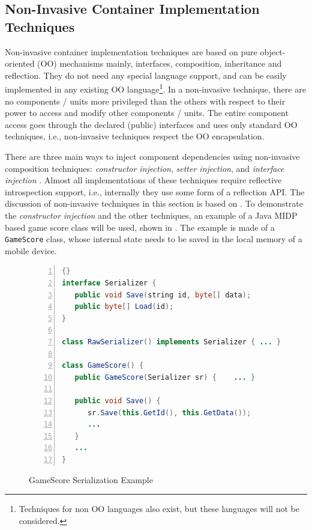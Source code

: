 \subsection{Non-Invasive Container Implementation Techniques}

Non-invasive container implementation techniques are based on pure object-oriented (OO) mechanisms mainly, interfaces, composition, inheritance and reflection. They do not need any special language support, and can be easily implemented in any existing OO language\footnote{Techniques for non OO languages also exist, but these languages will not be considered.}. In a non-invasive technique, there are no components / units more privileged than the others with respect to their power to access and modify other components / units. The entire component access goes through the declared (public) interfaces and uses only standard OO techniques, i.e., non-invasive techniques respect the OO encapsulation.

There are three main ways to inject component dependencies using non-invasive composition techniques: \textit{constructor injection}, \textit{setter injection}, and \textit{interface injection} \cite{fowler.ioc.04}. Almost all implementations of these techniques require reflective introspection support, i.e., internally they use some form of a reflection API. The discussion of non-invasive techniques in this section is based on \cite{fowler.ioc.04}. To demonstrate the \textit{constructor injection} and the other techniques, an example of a Java MIDP based game score class \cite{www.j2me} will be used, shown in . The example is made of a \texttt{Ga\-me\-Sco\-re} class, whose internal state needs to be saved in the local memory of a mobile device.

\begin{figure}[ht]
	\centering
	\begin{minipage}[b]{8.5cm}
	\begin{center}	
\begin{scriptsize}
		\begin{lstlisting}[numbers=left,language=Java,frame=leftline]{}
interface Serializer {
   public void Save(string id, byte[] data);
   public byte[] Load(id);
}

class RawSerializer() implements Serializer { ... }

class GameScore() {
   public GameScore(Serializer sr) {	...	}
	
   public void Save() {
      sr.Save(this.GetId(), this.GetData());
      ... 
   }
   ...
}	
		\end{lstlisting}
		\end{scriptsize}
	\end{center}
	\caption{GameScore Serialization Example}
	\label{c2f:gamescore1}
\end{minipage}	
\end{figure}

